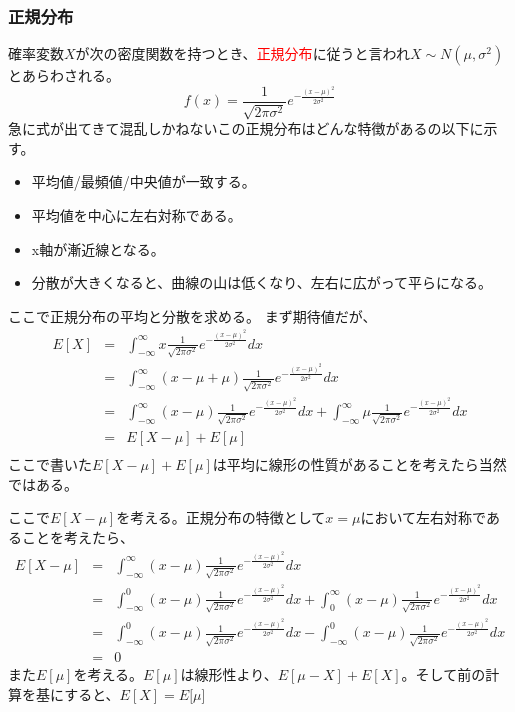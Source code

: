 \documentclass[a4paper,10pt]{jarticle}
\begin{document}
\subsubsection{正規分布}
確率変数$X$が次の密度関数を持つとき、\textcolor{red}{正規分布}に従うと言われ$X\sim N(\mu,\sigma^2)$とあらわされる。
\begin{equation}
    f(x) = \frac{1}{\sqrt{2\pi\sigma^2}}e^{-\frac{(x-\mu)^2}{2\sigma^2}}\tag{3,20}
\end{equation}
急に式が出てきて混乱しかねないこの正規分布はどんな特徴があるの以下に示す。
\begin{itemize}
    \item 平均値/最頻値/中央値が一致する。
    \item 平均値を中心に左右対称である。
    \item x軸が漸近線となる。
    \item 分散が大きくなると、曲線の山は低くなり、左右に広がって平らになる。
\end{itemize}
ここで正規分布の平均と分散を求める。
まず期待値だが、
\begin{eqnarray*}
    E[X] &=& \int_{-\infty}^{\infty} x\frac{1}{\sqrt{2\pi\sigma^2}}e^{-\frac{(x-\mu)^2}{2\sigma^2}}dx\\
    &=& \int_{-\infty}^{\infty} (x-\mu+\mu)\frac{1}{\sqrt{2\pi\sigma^2}}e^{-\frac{(x-\mu)^2}{2\sigma^2}}dx\\
    &=& \int_{-\infty}^{\infty} (x-\mu)\frac{1}{\sqrt{2\pi\sigma^2}}e^{-\frac{(x-\mu)^2}{2\sigma^2}}dx+\int_{-\infty}^{\infty} \mu\frac{1}{\sqrt{2\pi\sigma^2}}e^{-\frac{(x-\mu)^2}{2\sigma^2}}dx\\
    &=& E[X-\mu] +E[\mu]\\
\end{eqnarray*}
ここで書いた$ E[X-\mu] +E[\mu]$は平均に線形の性質があることを考えたら当然ではある。

ここで$E[X-\mu]$を考える。正規分布の特徴として$x=\mu$において左右対称であることを考えたら、
\begin{eqnarray*}
    E[X-\mu]&=& \int_{-\infty}^{\infty} (x-\mu)\frac{1}{\sqrt{2\pi\sigma^2}}e^{-\frac{(x-\mu)^2}{2\sigma^2}}dx\\
    &=& \int_{-\infty}^{0} (x-\mu)\frac{1}{\sqrt{2\pi\sigma^2}}e^{-\frac{(x-\mu)^2}{2\sigma^2}}dx+\int_{0}^{\infty} (x-\mu)\frac{1}{\sqrt{2\pi\sigma^2}}e^{-\frac{(x-\mu)^2}{2\sigma^2}}dx\\
    &=&\int_{-\infty}^{0} (x-\mu)\frac{1}{\sqrt{2\pi\sigma^2}}e^{-\frac{(x-\mu)^2}{2\sigma^2}}dx-\int_{-\infty}^{0} (x-\mu)\frac{1}{\sqrt{2\pi\sigma^2}}e^{-\frac{(x-\mu)^2}{2\sigma^2}}dx\\
    &=& 0
\end{eqnarray*}
また$E[\mu]$を考える。$E[\mu]$は線形性より、$E[\mu-X]+E[X]$。そして前の計算を基にすると、$E[X]=E[\mu$]
\end{document}
